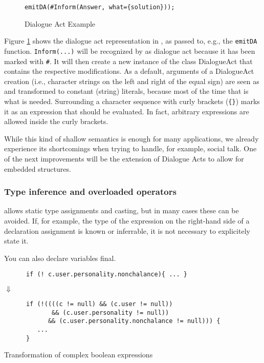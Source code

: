\begin{figure}[htb]
  \centering\small\texttt{emitDA(\#Inform(Answer, what=\{solution\}));}
  \vspace*{-1ex}\caption{\label{fig:DA}Dialogue Act Example}
\end{figure}

Figure \ref{fig:DA} shows the dialogue act representation in \vonda, as passed
to, e.g., the \texttt{emitDA} function. \texttt{Inform}\verb|(...)| will be
recognized by \vonda as dialogue act because it has been marked with
\verb|#|. It will then create a new instance of the class DialogueAct that
contains the respective modifications. As a default, arguments of a DialogueAct
creation (i.e., character strings on the left and right of the equal sign) are
seen as and transformed to constant (string) literals, because most of the time
that is what is needed.  Surrounding a character sequence with curly brackets
(\texttt{\{\}}) marks it as an expression that should be evaluated. In fact,
arbitrary expressions are allowed inside the curly brackets.

While this kind of shallow semantics is enough for many applications, we
already experience its shortcomings when trying to handle, for example, social
talk. One of the next improvements will be the extension of Dialogue Acts to
allow for embedded structures.


\subsubsection{Type inference and overloaded operators}
\label{sec:typeinference}

\vonda allows static type assignments and casting, but in many cases these can
be avoided. If, for example, the type of the expression on the right-hand side
of a declaration assignment is known or inferrable, it is not necessary to
explicitely state it.

You can also declare variables final.

\begin{table}[htbp]
  \centering
  \begin{small}
    \begin{lstlisting}
      if (! c.user.personality.nonchalance){ ... }
    \end{lstlisting}

    {\Large$\Downarrow$}\\

    \begin{lstlisting}
      if (!((((c != null) && (c.user != null))
             && (c.user.personality != null))
            && (c.user.personality.nonchalance != null))) {
         ...
      }
\end{lstlisting}
\end{small}

\caption{Transformation of complex boolean expressions}
\label{tab:multi-predaccess}
\end{table}
\vspace*{10pt}

